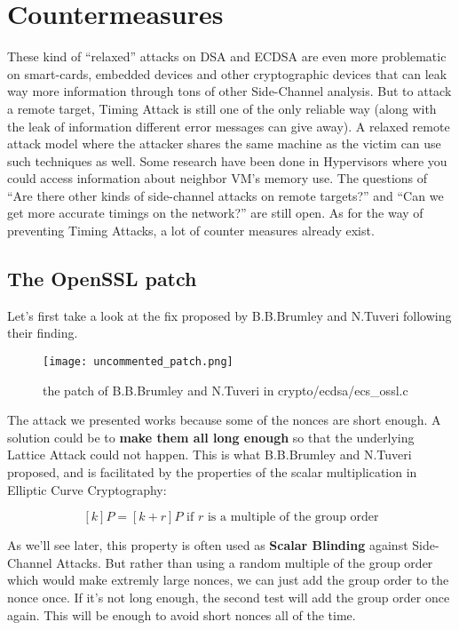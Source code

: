 \documentclass[a4paper,11pt]{article}
\begin{document}
\section{Countermeasures}

These kind of ``relaxed'' attacks on DSA and ECDSA are even more problematic on smart-cards, embedded devices and other cryptographic devices that can leak way more information through tons of other Side-Channel analysis. But to attack a remote target, Timing Attack is still one of the only reliable way (along with the leak of information different error messages can give away). A relaxed remote attack model where the attacker shares the same machine as the victim can use such techniques as well. Some research have been done in Hypervisors where you could access information about neighbor VM's memory use\cite{flushreload}\cite{flushreloadecdsa}\cite{flushreloadopenssl}. The questions of ``Are there other kinds of side-channel attacks on remote targets?'' and ``Can we get more accurate timings on the network?'' are still open. As for the way of preventing Timing Attacks, a lot of counter measures already exist.

\subsection{The OpenSSL patch}

Let's first take a look at the fix proposed by B.B.Brumley and N.Tuveri following their finding.

\begin{figure}[H]
\texttt{[image: uncommented\_patch.png]}
\caption{the patch of B.B.Brumley and N.Tuveri in crypto/ecdsa/ecs\_ossl.c}
\end{figure}

The attack we presented works because some of the nonces are short enough. A solution could be to \textbf{make them all long enough} so that the underlying Lattice Attack could not happen. This is what B.B.Brumley and N.Tuveri proposed, and is facilitated by the properties of the scalar multiplication in Elliptic Curve Cryptography:

$$ [k]P = [k + r]P \text{ if } r \text{ is a multiple of the group order} $$

As we'll see later, this property is often used as \textbf{Scalar Blinding} against Side-Channel Attacks. But rather than using a random multiple of the group order which would make extremly large nonces, we can just add the group order to the nonce once. If it's not long enough, the second test will add the group order once again. This will be enough to avoid short nonces all of the time.
\end{document}
